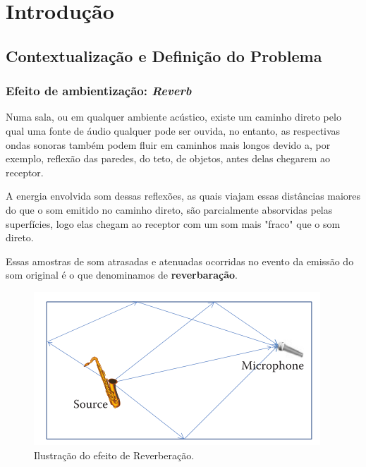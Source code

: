\chapter{Introdução}



\section{Contextualização e Definição do Problema}
	\subsection{Efeito  de ambientização: \textit{Reverb}}
	\label{aplicabilidade}
		
		Numa sala, ou em qualquer ambiente acústico, existe um caminho direto pelo qual uma fonte de áudio qualquer pode ser ouvida, no entanto, as respectivas ondas sonoras também podem fluir em caminhos mais longos devido a, por exemplo, reflexão das paredes, do teto, de objetos, antes delas chegarem ao receptor.
		
		A energia envolvida som dessas reflexões, as quais viajam essas distâncias maiores do que o som emitido no caminho direto, são parcialmente absorvidas pelas superfícies, logo elas chegam ao receptor com um som mais "fraco" que o som direto.
		
		Essas amostras de som atrasadas e atenuadas ocorridas no evento da emissão do som original é o que denominamos de \textbf{reverbaração}.
		
		\begin{figure}[!h b t]
			\centering
			\includegraphics[scale=0.5]{./figuras/reverb01.png}
			\caption{Ilustração do efeito de Reverberação.}
			\label{reverb01}
		\end{figure}
		
